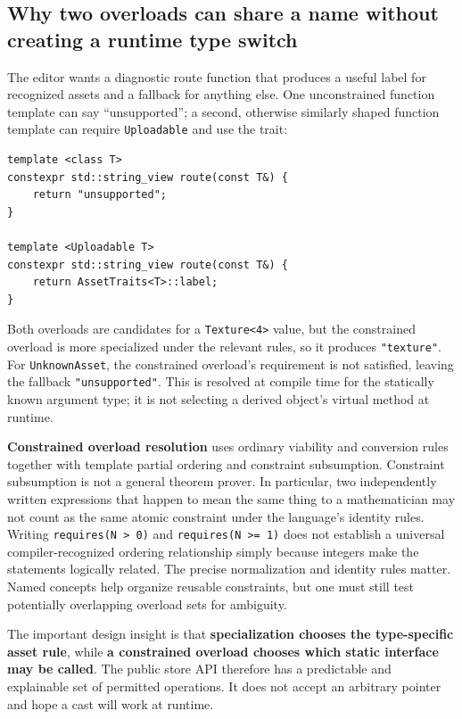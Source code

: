 \subsection{Why two overloads can share a name without creating a runtime type switch}\label{05-engine-i-ch005-why-two-overloads-can-share-a-name-without-creating-a-runtime-type-switch}

The editor wants a diagnostic route function that produces a useful label for recognized assets and a fallback for anything else. One unconstrained function template can say ``unsupported''; a second, otherwise similarly shaped function template can require \texttt{Uploadable} and use the trait:

\begin{verbatim}
template <class T>
constexpr std::string_view route(const T&) {
    return "unsupported";
}

template <Uploadable T>
constexpr std::string_view route(const T&) {
    return AssetTraits<T>::label;
}
\end{verbatim}

Both overloads are candidates for a \texttt{Texture\textless{}4\textgreater{}} value, but the constrained overload is more specialized under the relevant rules, so it produces \texttt{"texture"}. For \texttt{UnknownAsset}, the constrained overload's requirement is not satisfied, leaving the fallback \texttt{"unsupported"}. This is resolved at compile time for the statically known argument type; it is not selecting a derived object's virtual method at runtime.

\textbf{Constrained overload resolution} uses ordinary viability and conversion rules together with template partial ordering and constraint subsumption. Constraint subsumption is not a general theorem prover. In particular, two independently written expressions that happen to mean the same thing to a mathematician may not count as the same atomic constraint under the language's identity rules. Writing \texttt{requires(N\ \textgreater{}\ 0)} and \texttt{requires(N\ \textgreater{}=\ 1)} does not establish a universal compiler-recognized ordering relationship simply because integers make the statements logically related. The precise normalization and identity rules matter. Named concepts help organize reusable constraints, but one must still test potentially overlapping overload sets for ambiguity.

The important design insight is that \textbf{specialization chooses the type-specific asset rule}, while \textbf{a constrained overload chooses which static interface may be called}. The public store API therefore has a predictable and explainable set of permitted operations. It does not accept an arbitrary pointer and hope a cast will work at runtime.

